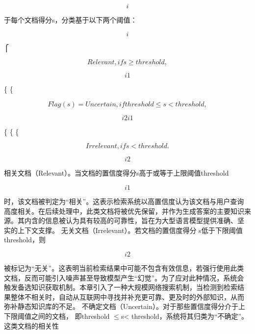 \documentclass[12pt,a4paper,openright,UTF8]{ctexbook}
\begin{document}
\begin{equation*}
i
\end{equation*}

于每个文档得分s，分类基于以下两个阈值：

\begin{equation*}
i
\end{equation*}

⎧

\begin{equation*}
{Relevant,if s\geq threshold,}
\end{equation*}

\begin{equation*}
i1
\end{equation*}

\{ \{

\begin{equation*}
Flag(s) =Uncertain,if threshold \leq s< threshold,
\end{equation*}

\begin{equation*}
i{2i1}
\end{equation*}

\{ \{ \{

\begin{equation*}
Irrelevant,if s< threshold.
\end{equation*}

\begin{equation*}
{i2}
\end{equation*}

相关文档（Relevant）。当文档的置信度得分s高于或等于上限阈值threshold

\begin{equation*}
i1
\end{equation*}

时，该文档被判定为“相关”。这表示检索系统以高置信度认为该文档与用户查询 高度相关。在后续处理中，此类文档将被优先保留，并作为生成答案的主要知识来 源。其内含的信息被认为具有较高的可靠性，旨在为大型语言模型提供准确、坚 实的上下文支撑。 无关文档（Irrelevant）。若文档的置信度得分 s低于下限阈值threshold，则

\begin{equation*}
i2
\end{equation*}

被标记为“无关”。这表明当前检索结果中可能不包含有效信息，若强行使用此类 文档，反而可能引入噪声甚至导致模型产生“幻觉”。为了应对此种情况，系统会 触发备选知识获取机制。本章引入了一种大规模网络搜索机制，当检测到检索结 果整体不相关时，自动从互联网中寻找并补充更可靠、更及时的外部知识，从而 弥补静态知识库的不足。 不确定文档（Uncertain）。对于那些置信度得分介于上下限阈值之间的文档， 即threshold $\leq$s< threshold，系统将其归类为“不确定”。这类文档的相关性
\end{document}
